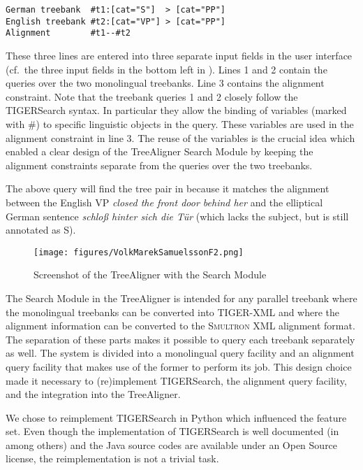 \documentclass[output=paper]{LSP/langsci}
\begin{document}
\ea
\begin{lstlisting}
German treebank  #t1:[cat="S"]  > [cat="PP"]
English treebank #t2:[cat="VP"] > [cat="PP"]
Alignment        #t1--#t2 
\end{lstlisting}
\z

These three lines are entered into three separate input fields in the user interface (cf.~the three input fields in the bottom left in ). Lines 1 and 2 contain the queries over the two monolingual treebanks. Line 3 contains the alignment constraint. Note that the treebank queries 1 and 2 closely follow the TIGERSearch syntax. In particular they allow the binding of variables (marked with \#) to specific linguistic objects in the query. These variables are used in the alignment constraint in line 3. The reuse of the variables is the crucial idea which enabled a clear design of the TreeAligner Search Module by keeping the alignment constraints separate from the queries over the two treebanks. 

The above query will find the tree pair in  because it matches the alignment between the English VP \textit{closed the front door behind her} and the elliptical German sentence \textit{schloß hinter sich die Tür} (which lacks the subject, but is still annotated as S). 

\begin{figure}
\texttt{[image: figures/VolkMarekSamuelssonF2.png]}
\caption{Screenshot of the TreeAligner with the Search Module}
\label{fig:volkmareksamuelsson:2}
\end{figure}

The Search Module in the TreeAligner is intended for any parallel treebank where the monolingual treebanks can be converted into TIGER-XML and where the alignment information can be converted to the S\textsc{multron} XML alignment format. The separation of these parts makes it possible to query each treebank separately as well. The system is divided into a monolingual query facility and an alignment query facility that makes use of the former to perform its job. This design choice made it necessary to (re)implement TIGERSearch, the alignment query facility, and the integration into the TreeAligner. 

We chose to reimplement TIGERSearch in Python which influenced the feature set. Even though the implementation of TIGERSearch is well documented (in \citealt{Lezius2002a} among others) and the Java source codes are available under an Open Source license, the reimplementation is not a trivial task. 
\end{document}
